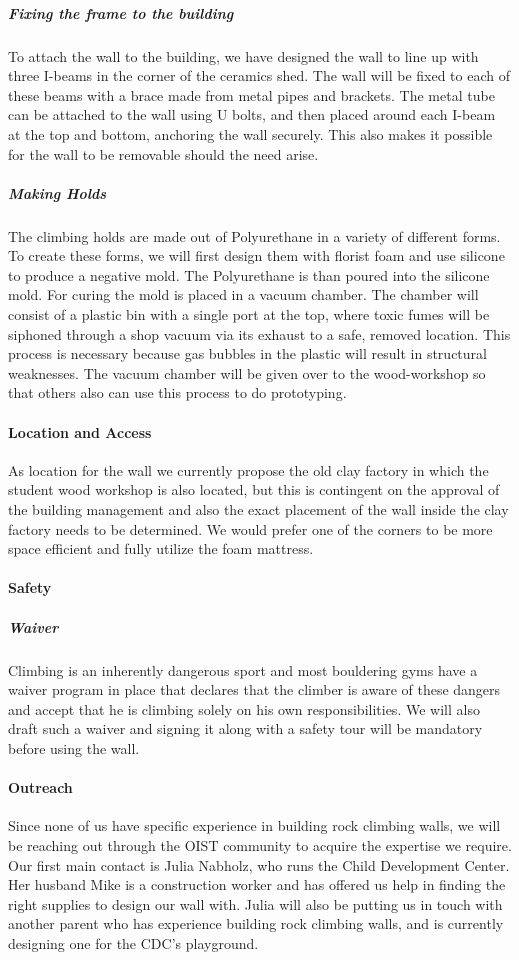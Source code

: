 \documentclass[a4paper, 12pt]{scrreprt}
\begin{document}
\subparagraph{Fixing the frame to the building}
To attach the wall to the building, we have designed the wall to line up with three I-beams in the corner of the ceramics shed. The wall will be fixed to each of these beams with a brace made from metal pipes and brackets. The metal tube can be attached to the wall using U bolts, and then placed around each I-beam at the top and bottom, anchoring the wall securely. This also makes it possible for the wall to be removable should the need arise.

\subparagraph{Making Holds}
The climbing holds are made out of Polyurethane in a variety of different forms. To create these forms, we will first design them with florist foam and use silicone to produce a negative mold. The Polyurethane is than poured into the silicone mold. For curing the mold is placed in a vacuum chamber. The chamber will consist of a plastic bin with a single port at the top, where toxic fumes will be siphoned through a shop vacuum via its exhaust to a safe, removed location. This process is necessary because gas bubbles in the plastic will result in structural weaknesses. The vacuum chamber will be given over to the wood-workshop so that others also can use this process to do prototyping.


\paragraph{Location and Access}
As location for the wall we currently propose the old clay factory in which the student wood workshop is also located, but this is contingent on the approval of the building management and also the exact placement of the wall inside the clay factory needs to be determined. We would prefer one of the corners to be more space efficient and fully utilize the foam mattress.

\paragraph{Safety}

\subparagraph{Waiver}
Climbing is an inherently dangerous sport and most bouldering gyms have a waiver program in place that declares that the climber is aware of these dangers and accept that he is climbing solely on his own responsibilities. We will also draft such a waiver and signing it along with a safety tour will be mandatory before using the wall.

\paragraph{Outreach}
Since none of us have specific experience in building rock climbing walls, we will be reaching out through the OIST community to acquire the expertise we require. Our first main contact is Julia Nabholz, who runs the Child Development Center. Her husband Mike is a construction worker and has offered us help in finding the right supplies to design our wall with. Julia will also be putting us in touch with another parent who has experience building rock climbing walls, and is currently designing one for the CDC's playground.
\end{document}
